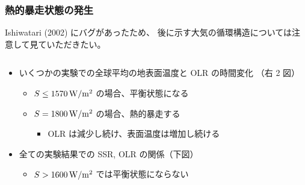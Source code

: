 \documentclass[aspectratio=149,9pt,fleqn]{beamer}
\begin{document}
\begin{frame}
	\frametitle{熱的暴走状態の発生}
	{\footnotesize
		Ishiwatari \etal (2002) にバグがあったため、
		後に示す大気の循環構造については注意して見ていただきたい。
	}
	\begin{columns}[T,onlytextwidth]
		\begin{column}{.6\textwidth}
			\begin{itemize}
				\item いくつかの実験での全球平均の地表面温度と OLR の時間変化
					（右 2 図）
					\begin{itemize}
						\item \(S\leq1570\hmu{W/m^2}\) の場合、平衡状態になる
						\item \(S=1800\hmu{W/m^2}\) の場合、熱的暴走する
							\begin{itemize}
								\item OLR は減少し続け、表面温度は増加し続ける
							\end{itemize}
					\end{itemize}
				\item 全ての実験結果での SSR, OLR の関係（下図）
					\begin{itemize}
						\item \(S>1600\hmu{W/m^2}\) では平衡状態にならない
					\end{itemize}

\end{itemize}
\end{column}
\end{columns}
\end{frame}
\end{document}
